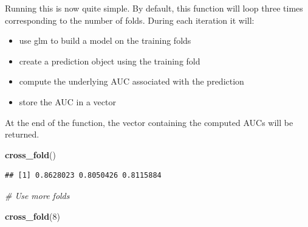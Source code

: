 \documentclass[]{book}
\newenvironment{Shaded}{\begin{snugshade}}{\end{snugshade}}
\newcommand{\KeywordTok}[1]{\textcolor[rgb]{0.13,0.29,0.53}{\textbf{#1}}}
\newcommand{\DataTypeTok}[1]{\textcolor[rgb]{0.13,0.29,0.53}{#1}}
\newcommand{\DecValTok}[1]{\textcolor[rgb]{0.00,0.00,0.81}{#1}}
\newcommand{\StringTok}[1]{\textcolor[rgb]{0.31,0.60,0.02}{#1}}
\newcommand{\CommentTok}[1]{\textcolor[rgb]{0.56,0.35,0.01}{\textit{#1}}}
\newcommand{\OperatorTok}[1]{\textcolor[rgb]{0.81,0.36,0.00}{\textbf{#1}}}
\newcommand{\NormalTok}[1]{#1}
\providecommand{\tightlist}{%
  \setlength{\itemsep}{0pt}\setlength{\parskip}{0pt}}
\begin{document}
\begin{Shaded}
\end{Shaded}

Running this is now quite simple. By default, this function will loop
three times corresponding to the number of folds. During each iteration
it will:

\begin{itemize}
\tightlist
\item
  use glm to build a model on the training folds
\item
  create a prediction object using the training fold
\item
  compute the underlying AUC associated with the prediction
\item
  store the AUC in a vector
\end{itemize}

At the end of the function, the vector containing the computed AUCs will
be returned.

\begin{Shaded}
\begin{Highlighting}[]
\KeywordTok{cross_fold}\NormalTok{()}
\end{Highlighting}
\end{Shaded}

\begin{verbatim}
## [1] 0.8628023 0.8050426 0.8115884
\end{verbatim}

\begin{Shaded}
\begin{Highlighting}[]
\CommentTok{# Use more folds}

\KeywordTok{cross_fold}\NormalTok{(}\DecValTok{8}\NormalTok{)}
\end{Highlighting}
\end{Shaded}
\end{document}
